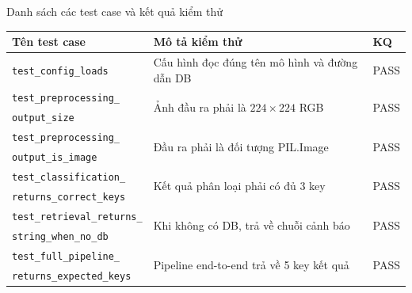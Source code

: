 \begin{table}[H]{Danh sách các test case và kết quả kiểm thử}
\centering
\small
\setlength{\tabcolsep}{4pt}
\begin{tabular}{p{5.5cm} p{7.2cm} p{1.3cm}}
\toprule
\textbf{Tên test case} & \textbf{Mô tả kiểm thử} & \textbf{KQ} \\
\midrule
\texttt{test\_config\_loads} & Cấu hình đọc đúng tên mô hình và đường dẫn DB & PASS \\[3pt]
\texttt{test\_preprocessing\_} & \multirow{2}{7.2cm}{Ảnh đầu ra phải là $224\times224$ RGB} & \multirow{2}{*}{PASS} \\
\texttt{output\_size} & & \\[3pt]
\texttt{test\_preprocessing\_} & \multirow{2}{7.2cm}{Đầu ra phải là đối tượng PIL.Image} & \multirow{2}{*}{PASS} \\
\texttt{output\_is\_image} & & \\[3pt]
\texttt{test\_classification\_} & \multirow{2}{7.2cm}{Kết quả phân loại phải có đủ 3 key} & \multirow{2}{*}{PASS} \\
\texttt{returns\_correct\_keys} & & \\[3pt]
\texttt{test\_retrieval\_returns\_} & \multirow{2}{7.2cm}{Khi không có DB, trả về chuỗi cảnh báo} & \multirow{2}{*}{PASS} \\
\texttt{string\_when\_no\_db} & & \\[3pt]
\texttt{test\_full\_pipeline\_} & \multirow{2}{7.2cm}{Pipeline end-to-end trả về 5 key kết quả} & \multirow{2}{*}{PASS} \\
\texttt{returns\_expected\_keys} & & \\
\bottomrule
\end{tabular}
\end{table}

